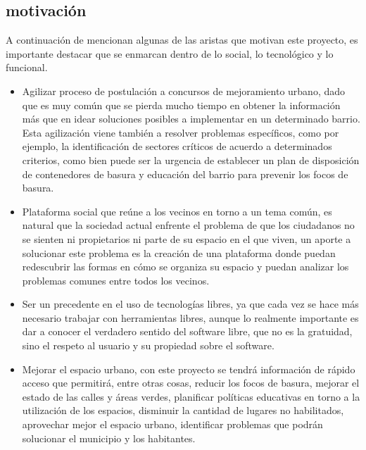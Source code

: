 \documentclass[12pt]{article}
\begin{document}
\subsection{motivación}
A continuación de mencionan algunas de las aristas que motivan este proyecto, es
importante destacar que se enmarcan dentro de lo social, lo tecnológico y lo
funcional.
\begin{itemize}
	\item Agilizar proceso de postulación a concursos de mejoramiento urbano, dado  que es
muy común que se pierda mucho tiempo en obtener la información  más que en idear
soluciones posibles a implementar en un determinado barrio. Esta agilización
viene también a resolver problemas específicos,  como por ejemplo, la
identificación de sectores críticos de acuerdo a determinados criterios, como
bien puede ser la urgencia de establecer un  plan de disposición de contenedores
de basura y educación del barrio  para prevenir los focos de basura.

	\item Plataforma social que reúne a los vecinos en torno a un tema común, es natural
que la sociedad actual enfrente el problema de que los ciudadanos  no se sienten
ni propietarios ni parte de su espacio en el que viven, un  aporte a solucionar
este problema es la creación de una plataforma donde  puedan redescubrir las
formas en cómo se organiza su espacio y puedan analizar los problemas comunes
entre todos los vecinos.

	\item Ser un precedente en el uso de tecnologías libres, ya que cada vez se hace más necesario trabajar
con herramientas libres, aunque lo realmente importante es dar a  conocer el
verdadero sentido del software libre, que no es la gratuidad,  sino el respeto
al usuario y su propiedad sobre el software.
	
	\item Mejorar el espacio urbano, con este proyecto se tendrá
información de rápido acceso que permitirá, entre otras cosas, reducir los focos
de basura, mejorar el estado de las calles y áreas verdes, planificar políticas
educativas en torno a la utilización de los espacios, disminuir la cantidad de
lugares no habilitados, aprovechar mejor el espacio urbano, identificar
problemas que podrán solucionar el municipio y los habitantes.
\end{itemize}
\end{document}
